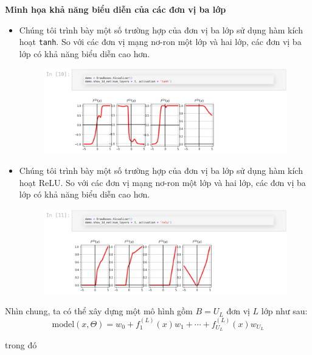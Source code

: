 \documentclass{book}
\begin{document}
    \textbf{Minh họa khả năng biểu diễn của các đơn vị ba lớp}
    \begin{itemize}
        \item Chúng tôi trình bày một số trường hợp của đơn vị ba lớp sử dụng hàm kích hoạt \texttt{tanh}. So với các đơn vị mạng nơ-ron một lớp và hai lớp, các đơn vị ba lớp có khả năng biểu diễn cao hơn.
        \begin{figure}[H]
            \centering
            \includegraphics[width=1.0\linewidth]{images/illu1.png}
            \label{fig:illu1}
        \end{figure}
    
        \item Chúng tôi trình bày một số trường hợp của đơn vị ba lớp sử dụng hàm kích hoạt ReLU. So với các đơn vị mạng nơ-ron một lớp và hai lớp, các đơn vị ba lớp có khả năng biểu diễn cao hơn.
        \begin{figure}[H]
            \centering
            \includegraphics[width=1.0\linewidth]{images/illu2.png}
            \label{fig:illu2}
        \end{figure}
    \end{itemize}

    Nhìn chung, ta có thể xây dựng một mô hình gồm \( B = U_L \) đơn vị \( L \) lớp như sau:
    \[
    \text{model}(x, \Theta) = w_0 + f^{(L)}_1(x) w_1 + \cdots + f^{(L)}_{U_L}(x) w_{U_L}
    \]
    
    trong đó
    
\end{document}
